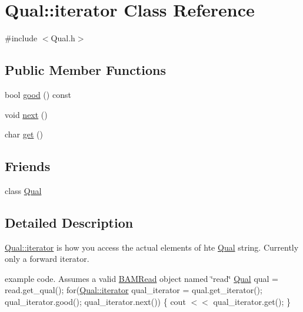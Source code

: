 \hypertarget{class_qual_1_1iterator}{
\section{Qual::iterator Class Reference}
\label{class_qual_1_1iterator}
}


{\ttfamily \#include $<$Qual.h$>$}

\subsection*{Public Member Functions}
\begin{DoxyCompactItemize}
\item 
bool \hyperlink{class_qual_1_1iterator_ae96d29e07caa42466c3720cd991ad8a7}{good} () const 
\item 
void \hyperlink{class_qual_1_1iterator_a44a9699ad7cf556e4bc2e149fa0cf767}{next} ()
\item 
char \hyperlink{class_qual_1_1iterator_ace15b4f5fbd4f98dd318388f72688b07}{get} ()
\end{DoxyCompactItemize}
\subsection*{Friends}
\begin{DoxyCompactItemize}
\item 
\hypertarget{class_qual_1_1iterator_a4c60aafa26514d054b2e1f1424ca6ea8}{
class \hyperlink{class_qual_1_1iterator_a4c60aafa26514d054b2e1f1424ca6ea8}{Qual}}
\label{class_qual_1_1iterator_a4c60aafa26514d054b2e1f1424ca6ea8}

\end{DoxyCompactItemize}


\subsection{Detailed Description}
\hyperlink{class_qual_1_1iterator}{Qual::iterator} is how you access the actual elements of hte \hyperlink{class_qual}{Qual} string. Currently only a forward iterator.

example code. Assumes a valid \hyperlink{class_b_a_m_read}{BAMRead} object named \char`\"{}read\char`\"{} \hyperlink{class_qual}{Qual} qual = read.get\_\-qual(); for(\hyperlink{class_qual_1_1iterator}{Qual::iterator} qual\_\-iterator = qual.get\_\-iterator(); qual\_\-iterator.good(); qual\_\-iterator.next()) \{ cout $<$$<$ qual\_\-iterator.get(); \} 

